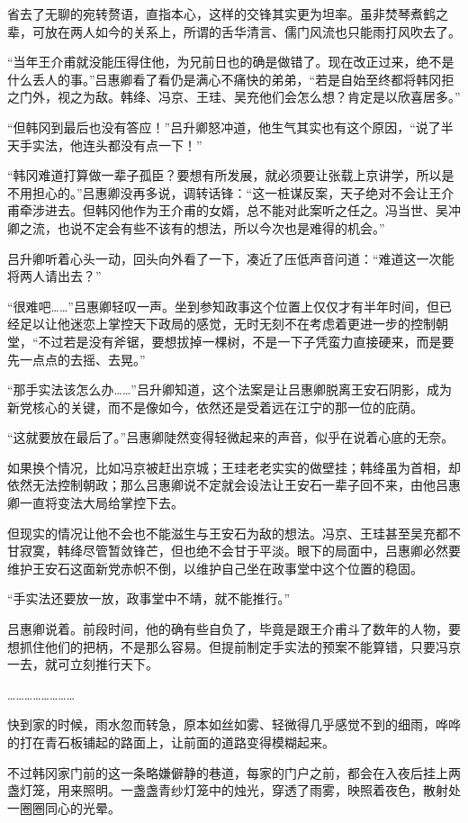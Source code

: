 省去了无聊的宛转赘语，直指本心，这样的交锋其实更为坦率。虽非焚琴煮鹤之辈，可放在两人如今的关系上，所谓的舌华清言、儒门风流也只能雨打风吹去了。

“当年王介甫就没能压得住他，为兄前日也的确是做错了。现在改正过来，绝不是什么丢人的事。”吕惠卿看了看仍是满心不痛快的弟弟，“若是自始至终都将韩冈拒之门外，视之为敌。韩绛、冯京、王珪、吴充他们会怎么想？肯定是以欣喜居多。”

“但韩冈到最后也没有答应！”吕升卿怒冲道，他生气其实也有这个原因，“说了半天手实法，他连头都没有点一下！”

“韩冈难道打算做一辈子孤臣？要想有所发展，就必须要让张载上京讲学，所以是不用担心的。”吕惠卿没再多说，调转话锋：“这一桩谋反案，天子绝对不会让王介甫牵涉进去。但韩冈他作为王介甫的女婿，总不能对此案听之任之。冯当世、吴冲卿之流，也说不定会有些不该有的想法，所以今次也是难得的机会。”

吕升卿听着心头一动，回头向外看了一下，凑近了压低声音问道：“难道这一次能将两人请出去？”

“很难吧……”吕惠卿轻叹一声。坐到参知政事这个位置上仅仅才有半年时间，但已经足以让他迷恋上掌控天下政局的感觉，无时无刻不在考虑着更进一步的控制朝堂，“不过若是没有斧锯，要想拔掉一棵树，不是一下子凭蛮力直接硬来，而是要先一点点的去摇、去晃。”

“那手实法该怎么办……”吕升卿知道，这个法案是让吕惠卿脱离王安石阴影，成为新党核心的关键，而不是像如今，依然还是受着远在江宁的那一位的庇荫。

“这就要放在最后了。”吕惠卿陡然变得轻微起来的声音，似乎在说着心底的无奈。

如果换个情况，比如冯京被赶出京城；王珪老老实实的做壁挂；韩绛虽为首相，却依然无法控制朝政；那么吕惠卿说不定就会设法让王安石一辈子回不来，由他吕惠卿一直将变法大局给掌控下去。

但现实的情况让他不会也不能滋生与王安石为敌的想法。冯京、王珪甚至吴充都不甘寂寞，韩绛尽管暂敛锋芒，但也绝不会甘于平淡。眼下的局面中，吕惠卿必然要维护王安石这面新党赤帜不倒，以维护自己坐在政事堂中这个位置的稳固。

“手实法还要放一放，政事堂中不靖，就不能推行。”

吕惠卿说着。前段时间，他的确有些自负了，毕竟是跟王介甫斗了数年的人物，要想抓住他们的把柄，不是那么容易。但提前制定手实法的预案不能算错，只要冯京一去，就可立刻推行天下。

……………………

快到家的时候，雨水忽而转急，原本如丝如雾、轻微得几乎感觉不到的细雨，哗哗的打在青石板铺起的路面上，让前面的道路变得模糊起来。

不过韩冈家门前的这一条略嫌僻静的巷道，每家的门户之前，都会在入夜后挂上两盏灯笼，用来照明。一盏盏青纱灯笼中的烛光，穿透了雨雾，映照着夜色，散射处一圈圈同心的光晕。

